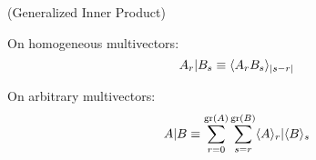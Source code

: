 \begin{corollary}
	(Generalized Inner Product)
	
	On homogeneous multivectors:
	\[A_r | B_s \equiv \langle A_rB_s \rangle_{\left|s-r\right|}\]
	
	On arbitrary multivectors:
	\[A | B \equiv \sum_{r=0}^{\mathrm{gr}\left(A\right)}\sum_{s=r}^{\mathrm{gr}\left(B\right)} \langle A \rangle_{r} | \langle B \rangle_{s}\]
\end{corollary}
